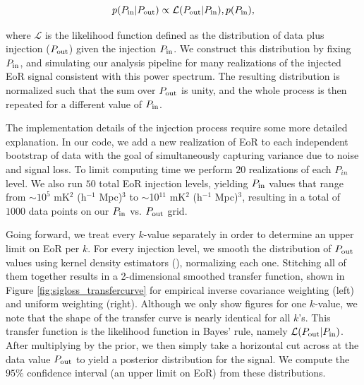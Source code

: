 \documentclass[preprint2,numberedappendix,tighten]{aastex6}  %
\begin{document}
\begin{equation}
\label{eq:Bayes}
p(P_{\rm in} | P_{\rm out}) \propto {\mathcal{L} (  P_{\rm out} | P_{\rm in})},
  p(P_{\rm in}) ,
\end{equation}

\noindent where $\mathcal{L} $ is the likelihood function defined 
as the distribution of data plus injection ($P_{\rm out}$) given the injection $P_{\rm in}$.  We construct this distribution  
by fixing $P_{\rm in}$, and simulating our analysis pipeline for many realizations of the injected EoR signal 
consistent with this power spectrum. The resulting distribution is normalized such that the sum over $P_{\rm out}$ is unity, and the 
whole process is then repeated for a different value of $P_{\rm in}$. 


The implementation details of the injection process require some more detailed explanation. In our code, we add a new realization of EoR to each independent bootstrap of data with the goal of simultaneously capturing variance due to noise and signal loss. To limit computing time we perform $20$ realizations of each $P_{in}$ level. We also run $50$ total EoR injection levels, yielding $P_{\rm in}$ values that range from $\sim$$10^{5}$ mK$^{2}$ (h$^{-1}$ Mpc)$^{3}$ to $\sim$10$^{11}$ mK$^{2}$ (h$^{-1}$ Mpc)$^{3}$, resulting in a total of $1000$ data points on our $P_{\rm in}$ vs. $P_{\rm out}$ grid. 

Going forward, we treat every $k$-value separately in order to determine an upper limit on EoR per $k$. For every injection level, we smooth the distribution of $P_{\rm out}$ values using kernel density estimators (\citealt{scott2008kernel}), normalizing each one. Stitching all of them together results in a 2-dimensional smoothed transfer function, shown in Figure \ref{fig:sigloss_transfercurve} for empirical inverse covariance weighting (left) and uniform weighting (right). Although we only show figures for one $k$-value, we note that 
the shape of the transfer curve is nearly identical for all $k$'s. This transfer function is the likelihood function in Bayes' rule, namely $\mathcal{L} (  P_{\rm out} | P_{\rm in})$. After multiplying by the prior, we then simply take a horizontal cut across at the data value $P_{\rm out}$ to yield a posterior distribution for the signal. We compute the $95\%$ confidence interval (an upper limit on EoR) from these distributions.
\end{document}
